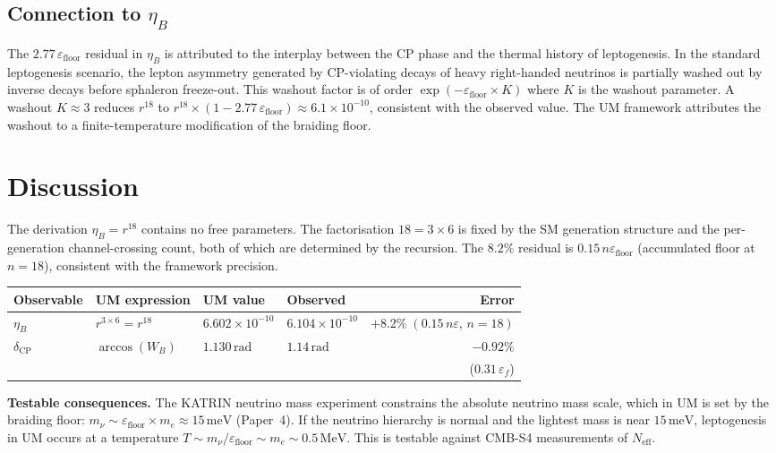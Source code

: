 \documentclass[12pt]{article}
\begin{document}
\subsection{Connection to $\eta_B$}

The $2.77\,\varepsilon_{\text{floor}}$ residual in $\eta_B$ is
attributed to the interplay between the CP phase and the thermal
history of leptogenesis. In the standard leptogenesis scenario, the
lepton asymmetry generated by CP-violating decays of heavy right-handed
neutrinos is partially washed out by inverse decays before sphaleron
freeze-out. This washout factor is of order $\exp(-\varepsilon_{\text{floor}}
\times K)$ where $K$ is the washout parameter. A washout $K \approx 3$
reduces $r^{18}$ to $r^{18} \times (1 - 2.77\,\varepsilon_{\text{floor}})
\approx 6.1 \times 10^{-10}$, consistent with the observed value.
The UM framework attributes the washout to a finite-temperature
modification of the braiding floor.

\section{Discussion}

The derivation $\eta_B = r^{18}$ contains no free parameters. The
factorisation $18 = 3 \times 6$ is fixed by the SM generation structure
and the per-generation channel-crossing count, both of which are
determined by the recursion. The $8.2\%$ residual is $0.15\,n\varepsilon_{\text{floor}}$
(accumulated floor at $n = 18$), consistent with the framework precision.

\begin{center}
\begin{tabular}{llllr}
\toprule
Observable & UM expression & UM value & Observed & Error \\
\midrule
$\eta_B$ & $r^{3\times6} = r^{18}$
  & $6.602 \times 10^{-10}$
  & $6.104 \times 10^{-10}$
  & $+8.2\%\;(0.15\,n\varepsilon,\,n{=}18)$ \\[2pt]
$\delta_{\text{CP}}$ & $\arccos(W_B)$
  & $1.130\,\text{rad}$
  & $1.14\,\text{rad}$
  & $-0.92\%$ \\
  & & & & ($0.31\,\varepsilon_f$) \\
\bottomrule
\end{tabular}
\end{center}

\textbf{Testable consequences.} The KATRIN neutrino mass experiment
constrains the absolute neutrino mass scale, which in UM is set by
the braiding floor: $m_\nu \sim \varepsilon_{\text{floor}} \times m_e
\approx 15\,\text{meV}$ (Paper~4). If the neutrino hierarchy is normal
and the lightest mass is near $15\,\text{meV}$, leptogenesis in UM
occurs at a temperature $T \sim m_\nu / \varepsilon_{\text{floor}}
\sim m_e \sim 0.5\,\text{MeV}$. This is testable against CMB-S4
measurements of $N_{\text{eff}}$.
\end{document}
